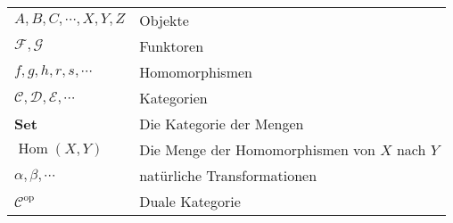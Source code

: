 \documentclass[a4paper]{amsart}
\theoremstyle{definition}
\DeclareMathOperator{\Hom}{Hom}
\begin{document}
\begin{tabular}{ll}
    $A, B, C, \cdots, X, Y, Z$          & Objekte\\
    $\mathcal F,\mathcal G$             & Funktoren\\
    $f, g, h, r, s, \cdots$             & Homomorphismen\\
    $\mathcal C, \mathcal D, \mathcal E, \cdots$ & Kategorien\\
    \textbf{Set}                        & Die Kategorie der Mengen\\
    $\Hom( X, Y)$                       & Die Menge der Homomorphismen von $X$ nach $Y$\\
    $\alpha, \beta, \cdots$             & natürliche Transformationen\\
    $\mathcal C ^{\text{op}}$           & Duale Kategorie
\end{tabular}
\end{document}
